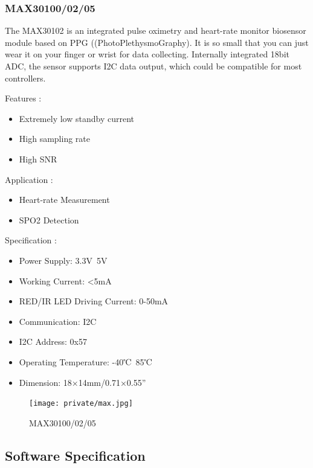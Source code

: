 \documentclass[14pt]{extarticle}
\begin{document}
\subsubsection{MAX30100/02/05}

\par The MAX30102 is an integrated pulse oximetry and heart-rate monitor biosensor module based on PPG ((PhotoPlethysmoGraphy). It is so small that you can just wear it on your finger or wrist for data collecting. Internally integrated 18bit ADC, the sensor supports I2C data output, which could be compatible for most controllers.

\begin{multicols}{2}
    Features :
    \begin{itemize}
        \item Extremely low standby current
        \item High sampling rate
        \item High SNR
    \end{itemize}
    
    
    Application :
    \begin{itemize}
        \item Heart-rate Measurement
        \item SPO2 Detection
    \end{itemize}
    
    Specification : 
    \begin{itemize}
        \item Power Supply: 3.3V~5V
        \item Working Current: <5mA
        \item RED/IR LED Driving Current: 0-50mA
        \item Communication: I2C
        \item I2C Address: 0x57
        \item Operating Temperature: -40℃~85℃
        \item Dimension: 18×14mm/0.71×0.55”
    \end{itemize}    
\end{multicols}

\vspace{2em}
\begin{figure}[!h]
    \centering
    \texttt{[image: private/max.jpg]}
    \caption{MAX30100/02/05}
    \label{fig:max}
\end{figure}

\newpage
\subsection{Software Specification}
\end{document}
